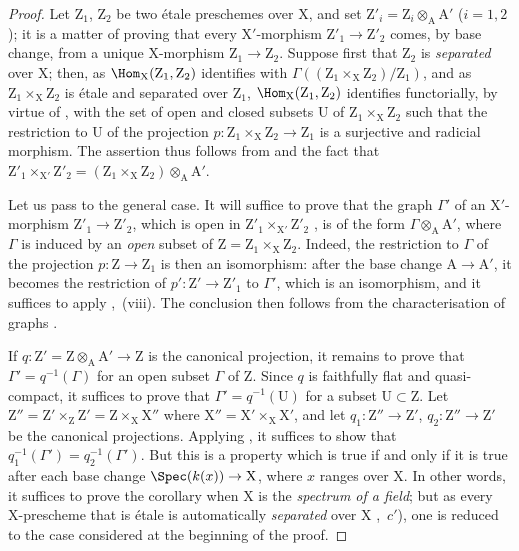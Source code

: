 \begin{proof}
Let $\mathrm{Z}_1$, $\mathrm{Z}_2$ be two \'{e}tale preschemes over X, and set $\mathrm{Z}'_i=\mathrm{Z}_i\otimes_{\mathrm{A}}\mathrm{A}'$ ($i=1,2$);
it is a matter of proving that every $\mathrm{X}'$-morphism $\mathrm{Z}'_1\to\mathrm{Z}'_2$ comes, by base change, from a unique X-morphism $\mathrm{Z}_1\to\mathrm{Z}_2$.
Suppose first that $\mathrm{Z}_2$ is \emph{separated} over X;
then, as $\Hom_{\mathrm{X}}(\mathrm{Z}_1,\mathrm{Z}_2)$ identifies with $\Gamma((\mathrm{Z}_1\times_{\mathrm{X}}\mathrm{Z}_2)/\mathrm{Z}_1)$, and as $\mathrm{Z}_1\times_{\mathrm{X}}\mathrm{Z}_2$ is \'{e}tale and separated over $\mathrm{Z}_1$, $\Hom_{\mathrm{X}}(\mathrm{Z}_1,\mathrm{Z}_2)$ identifies functorially, by virtue of , with the set of open and closed subsets U of $\mathrm{Z}_1\times_{\mathrm{X}}\mathrm{Z}_2$ such that the restriction to U of the projection $p:\mathrm{Z}_1\times_{\mathrm{X}}\mathrm{Z}_2\to\mathrm{Z}_1$ is a surjective and radicial morphism.
The assertion thus follows from  and the fact that $\mathrm{Z}'_1\times_{\mathrm{X}'}\mathrm{Z}'_2=(\mathrm{Z}_1\times_{\mathrm{X}}\mathrm{Z}_2)\otimes_{\mathrm{A}}\mathrm{A}'$.

Let us pass to the general case.
It will suffice to prove that the graph $\Gamma'$ of an $\mathrm{X}'$-morphism $\mathrm{Z}'_1\to\mathrm{Z}'_2$, which is open in $\mathrm{Z}'_1\times_{\mathrm{X}'}\mathrm{Z}'_2$ , is of the form $\Gamma\otimes_{\mathrm{A}}\mathrm{A}'$, where $\Gamma$ is induced by an \emph{open} subset of $\mathrm{Z}=\mathrm{Z}_1\times_{\mathrm{X}}\mathrm{Z}_2$.
Indeed, the restriction to $\Gamma$ of the projection $p:\mathrm{Z}\to\mathrm{Z}_1$ is then an isomorphism: after the base change $\mathrm{A}\to\mathrm{A}'$, it becomes the restriction of $p':\mathrm{Z}'\to\mathrm{Z}'_1$ to $\Gamma'$, which is an isomorphism, and it suffices to apply ,~(viii).
The conclusion then follows from the characterisation of graphs .

If $q:\mathrm{Z}'=\mathrm{Z}\otimes_{\mathrm{A}}\mathrm{A}'\to\mathrm{Z}$ is the canonical projection, it remains to prove that $\Gamma'=q^{-1}(\Gamma)$ for an open subset $\Gamma$ of Z.
Since $q$ is faithfully flat and quasi-compact, it suffices  to prove that $\Gamma'=q^{-1}(\mathrm{U})$ for a subset $\mathrm{U}\subset\mathrm{Z}$.
Let $\mathrm{Z}''=\mathrm{Z}'\times_{\mathrm{Z}}\mathrm{Z}'=\mathrm{Z}\times_{\mathrm{X}}\mathrm{X}''$ where $\mathrm{X}''=\mathrm{X}'\times_{\mathrm{X}}\mathrm{X}'$, and let $q_1:\mathrm{Z}''\to\mathrm{Z}'$, $q_2:\mathrm{Z}''\to\mathrm{Z}'$ be the canonical projections.
Applying , it suffices to show that $q_1^{-1}(\Gamma')=q_2^{-1}(\Gamma')$.
But this is a property which is true if and only if it is true after each base change $\Spec(k(x))\to\mathrm{X}$, where $x$ ranges over X.
In other words, it suffices to prove the corollary when X is the \emph{spectrum of a field};
but as every X-prescheme that is \'{e}tale is automatically \emph{separated} over X ,~$c'$), one is reduced to the case considered at the beginning of the proof.
\end{proof}

